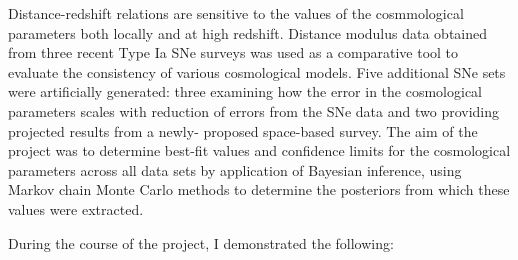 Distance-redshift relations are sensitive to the values of the cosmmological parameters both locally and at high redshift. Distance modulus data obtained from three recent Type Ia SNe surveys was used as a comparative tool to evaluate the consistency of various cosmological models. Five additional SNe sets were artificially generated: three examining how the error in the cosmological parameters scales with reduction of errors from the SNe data and two providing projected results from a newly- proposed space-based survey. The aim of the project was to determine best-fit values and confidence limits for the cosmological parameters across all data sets by application of Bayesian inference, using Markov chain Monte Carlo methods to determine the posteriors from which these values were extracted.

During the course of the project, I demonstrated the following:


